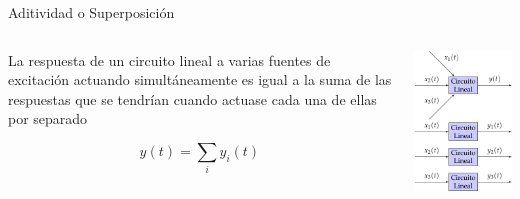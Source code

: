 \documentclass[xcolor={usenames,svgnames,dvipsnames}]{beamer}
\begin{document}
\begin{frame}[label={sec:orge759043}]{Aditividad o Superposición}
\begin{columns}
\begin{column}{0.5\columnwidth}
La respuesta de un \alert{circuito lineal} a varias fuentes de excitación actuando simultáneamente es igual a la suma de las respuestas que se tendrían cuando actuase cada una de ellas por separado

\[
y(t) = \sum_i y_i(t)
\]
\end{column}

\begin{column}{0.5\columnwidth}
\begin{center}
\includegraphics[width=.9\linewidth]{figs/superposicion.pdf}
\end{center}
\end{column}
\end{columns}
\end{frame}
\end{document}
